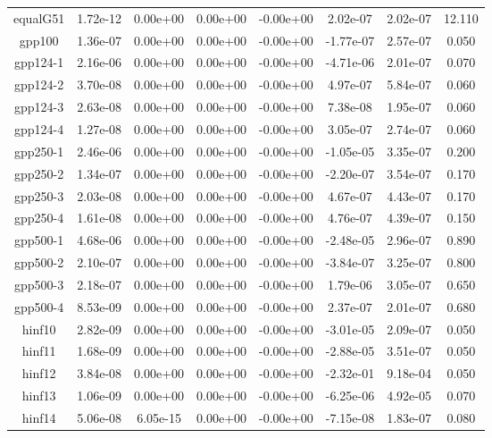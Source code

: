 {{\begin{table}[h]
\begin{center}
{\begin{tabular}{cccccccc}
            equalG51 & 1.72e-12 & 0.00e+00 & 0.00e+00 & -0.00e+00 & 2.02e-07 & 2.02e-07 & 12.110 \\ 
              gpp100 & 1.36e-07 & 0.00e+00 & 0.00e+00 & -0.00e+00 & -1.77e-07 & 2.57e-07 & 0.050 \\ 
            gpp124-1 & 2.16e-06 & 0.00e+00 & 0.00e+00 & -0.00e+00 & -4.71e-06 & 2.01e-07 & 0.070 \\ 
            gpp124-2 & 3.70e-08 & 0.00e+00 & 0.00e+00 & -0.00e+00 & 4.97e-07 & 5.84e-07 & 0.060 \\ 
            gpp124-3 & 2.63e-08 & 0.00e+00 & 0.00e+00 & -0.00e+00 & 7.38e-08 & 1.95e-07 & 0.060 \\ 
            gpp124-4 & 1.27e-08 & 0.00e+00 & 0.00e+00 & -0.00e+00 & 3.05e-07 & 2.74e-07 & 0.060 \\ 
            gpp250-1 & 2.46e-06 & 0.00e+00 & 0.00e+00 & -0.00e+00 & -1.05e-05 & 3.35e-07 & 0.200 \\ 
            gpp250-2 & 1.34e-07 & 0.00e+00 & 0.00e+00 & -0.00e+00 & -2.20e-07 & 3.54e-07 & 0.170 \\ 
            gpp250-3 & 2.03e-08 & 0.00e+00 & 0.00e+00 & -0.00e+00 & 4.67e-07 & 4.43e-07 & 0.170 \\ 
            gpp250-4 & 1.61e-08 & 0.00e+00 & 0.00e+00 & -0.00e+00 & 4.76e-07 & 4.39e-07 & 0.150 \\ 
            gpp500-1 & 4.68e-06 & 0.00e+00 & 0.00e+00 & -0.00e+00 & -2.48e-05 & 2.96e-07 & 0.890 \\ 
            gpp500-2 & 2.10e-07 & 0.00e+00 & 0.00e+00 & -0.00e+00 & -3.84e-07 & 3.25e-07 & 0.800 \\ 
            gpp500-3 & 2.18e-07 & 0.00e+00 & 0.00e+00 & -0.00e+00 & 1.79e-06 & 3.05e-07 & 0.650 \\ 
            gpp500-4 & 8.53e-09 & 0.00e+00 & 0.00e+00 & -0.00e+00 & 2.37e-07 & 2.01e-07 & 0.680 \\ 
              hinf10 & 2.82e-09 & 0.00e+00 & 0.00e+00 & -0.00e+00 & -3.01e-05 & 2.09e-07 & 0.050 \\ 
              hinf11 & 1.68e-09 & 0.00e+00 & 0.00e+00 & -0.00e+00 & -2.88e-05 & 3.51e-07 & 0.050 \\ 
              hinf12 & 3.84e-08 & 0.00e+00 & 0.00e+00 & -0.00e+00 & -2.32e-01 & 9.18e-04 & 0.050 \\ 
              hinf13 & 1.06e-09 & 0.00e+00 & 0.00e+00 & -0.00e+00 & -6.25e-06 & 4.92e-05 & 0.070 \\ 
              hinf14 & 5.06e-08 & 6.05e-15 & 0.00e+00 & -0.00e+00 & -7.15e-08 & 1.83e-07 & 0.080 \\ 

\end{tabular}}
\end{center}
\end{table}}}
